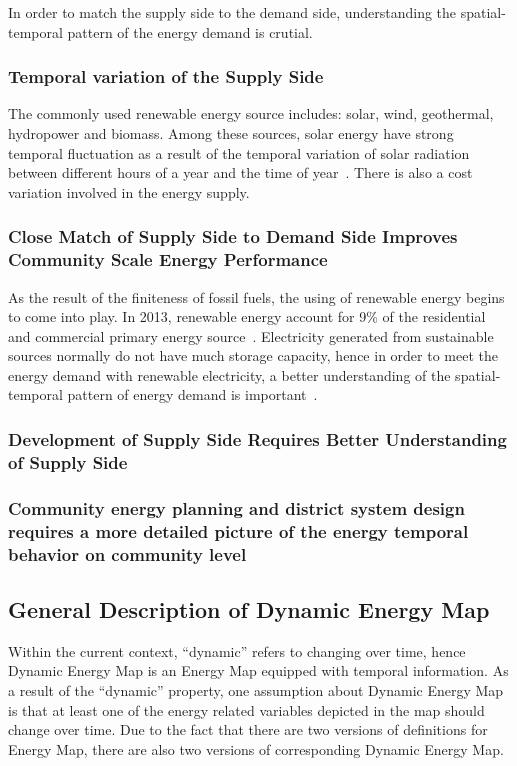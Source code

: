 \documentclass[12pt]{article}
\begin{document}
In order to match the supply side to the demand side,
understanding the spatial-temporal pattern of the energy demand is
crutial.
\subsubsection{Temporal variation of the Supply Side}
The commonly used renewable energy source includes: solar, wind,
geothermal, hydropower and biomass. Among these sources, solar energy
have strong temporal fluctuation as a result of the temporal variation
of solar radiation between different hours of a year and the time of
year~\cite{EIARenewable2015}. There is also a cost variation involved
in the energy supply.

\subsubsection{Close Match of Supply Side to Demand Side Improves Community Scale Energy Performance} 
As the result of the finiteness of fossil fuels, the using of
renewable energy begins to come into play. In 2013, renewable energy
account for 9\% of the residential and commercial primary energy
source~\cite{EIAPrimary2013}. Electricity generated from sustainable
sources normally do not have much storage capacity, hence in order to
meet the energy demand with renewable electricity, a better
understanding of the spatial-temporal pattern of energy demand is
important~\cite{Mikkola2014256}.

\subsubsection{Development of Supply Side Requires Better Understanding of Supply Side} 
\subsubsection{Community energy planning and district system design requires a more detailed picture of the energy temporal behavior on community level} 
\subsection{General Description of Dynamic Energy Map}
Within the current context, ``dynamic'' refers to changing over time,
hence Dynamic Energy Map is an Energy Map equipped with temporal
information. As a result of the ``dynamic'' property, one assumption
about Dynamic Energy Map is that at least one of the energy related
variables depicted in the map should change over time. Due to the fact
that there are two versions of definitions for Energy Map, there are
also two versions of corresponding Dynamic Energy Map.
\end{document}
